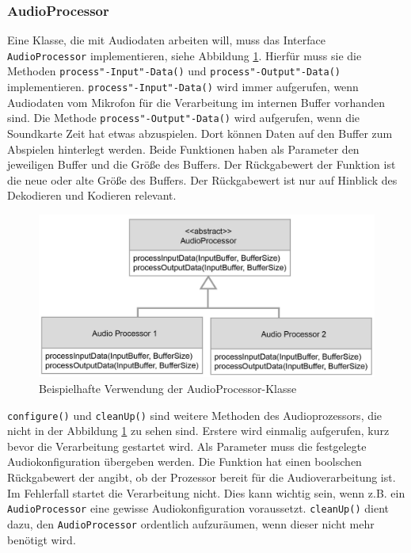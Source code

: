 \subsubsection{AudioProcessor}
Eine Klasse, die mit Audiodaten arbeiten will, muss das Interface \texttt{AudioProcessor} implementieren, siehe Abbildung \ref{Fig:AudioProcessorExample}. Hierfür muss sie die Methoden \texttt{process"-Input"-Data()} und \texttt{process"-Output"-Data()} implementieren. \texttt{process"-Input"-Data()} wird immer aufgerufen, wenn Audiodaten vom Mikrofon für die Verarbeitung im internen Buffer vorhanden sind. Die Methode \texttt{process"-Output"-Data()} wird aufgerufen, wenn die Soundkarte Zeit hat etwas abzuspielen. Dort können Daten auf den Buffer zum Abspielen hinterlegt werden. Beide Funktionen haben als Parameter den jeweiligen Buffer und die Größe des Buffers. Der Rückgabewert der Funktion ist die neue oder alte Größe des Buffers. Der Rückgabewert ist nur auf Hinblick des Dekodieren und Kodieren relevant.
\newline
\begin{figure}[htp]
\centering
\includegraphics[width=1\textwidth]{../img/AudioProcessorExample}
\caption{Beispielhafte Verwendung der AudioProcessor-Klasse}
\label{Fig:AudioProcessorExample}
\end{figure}

\texttt{configure()} und \texttt{cleanUp()} sind weitere Methoden des Audioprozessors, die nicht in der Abbildung \ref{Fig:AudioProcessorExample} zu sehen sind. Erstere wird einmalig aufgerufen, kurz bevor die Verarbeitung gestartet wird. Als Parameter muss die festgelegte Audiokonfiguration übergeben werden. Die Funktion hat einen boolschen Rückgabewert der angibt, ob der Prozessor bereit für die Audioverarbeitung ist. Im Fehlerfall startet die Verarbeitung nicht. Dies kann wichtig sein, wenn z.B. ein \texttt{AudioProcessor} eine gewisse Audiokonfiguration voraussetzt. \texttt{cleanUp()} dient dazu, den \texttt{AudioProcessor} ordentlich aufzuräumen, wenn dieser nicht mehr benötigt wird.

